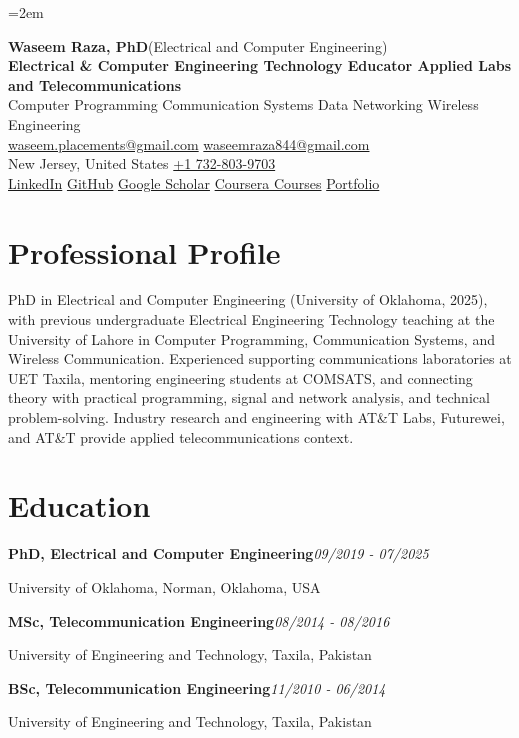 \documentclass[9pt,letterpaper]{extarticle}
\newcommand{\entry}[2]{\Needspace{4\baselineskip}\textbf{#1}\hfill\textit{#2}\par}
\begin{document}
\emergencystretch=2em
\begin{center}
{\LARGE\bfseries Waseem Raza, PhD}{\normalsize\mdseries \enspace (Electrical and Computer Engineering)}\\[2pt]
{\large\bfseries Electrical \& Computer Engineering Technology Educator \textbar{} Applied Labs and Telecommunications}\\[1pt]
{\small Computer Programming \textbar{} Communication Systems \textbar{} Data Networking \textbar{} Wireless Engineering}\\[3pt]
{\footnotesize {}\enspace \href{mailto:waseem.placements@gmail.com}{waseem.placements@gmail.com} \textbar{} \href{mailto:waseemraza844@gmail.com}{waseemraza844@gmail.com}\\[1pt]New Jersey, United States \quad {}\enspace \href{tel:+17328039703}{+1 732-803-9703}\\[1pt]\href{https://www.linkedin.com/in/waseem-raza-phd-9a737858/}{LinkedIn} \textbar{} \href{https://github.com/WaseemRaza844}{GitHub} \textbar{} \href{https://scholar.google.com/citations?user=d58Drr0AAAAJ\&hl=en}{Google Scholar} \textbar{} \href{https://waseemraza844.github.io/portfolio/learning.html}{Coursera Courses} \textbar{} \href{https://waseemraza844.github.io/portfolio/}{Portfolio}}
\end{center}
\vspace{-5pt}
\section{Professional Profile}
PhD in Electrical and Computer Engineering (University of Oklahoma, 2025), with previous undergraduate Electrical Engineering Technology teaching at the University of Lahore in Computer Programming, Communication Systems, and Wireless Communication. Experienced supporting communications laboratories at UET Taxila, mentoring engineering students at COMSATS, and connecting theory with practical programming, signal and network analysis, and technical problem-solving. Industry research and engineering with AT\&T Labs, Futurewei, and AT\&T provide applied telecommunications context.
\section{Education}
\entry{PhD, Electrical and Computer Engineering}{09/2019 - 07/2025}
University of Oklahoma, Norman, Oklahoma, USA\par
\entry{MSc, Telecommunication Engineering}{08/2014 - 08/2016}
University of Engineering and Technology, Taxila, Pakistan\par
\entry{BSc, Telecommunication Engineering}{11/2010 - 06/2014}
University of Engineering and Technology, Taxila, Pakistan\par
{}
\end{document}
